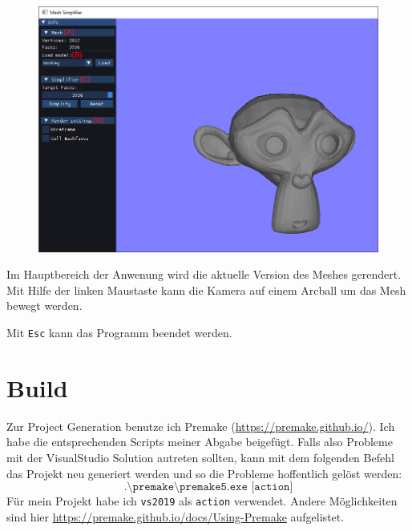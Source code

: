 \documentclass[a4paper,12pt]{book}
\begin{document}
\begin{figure}[h]
	\centering
	\includegraphics[width=\linewidth]{gui.png}
\end{figure}

Im Hauptbereich der Anwenung wird die aktuelle Version des Meshes gerendert. Mit Hilfe der linken Maustaste kann die Kamera auf einem Arcball um das Mesh bewegt werden.

Mit \texttt{Esc} kann das Programm beendet werden.

\section*{Build}

Zur Project Generation benutze ich Premake (\url{https://premake.github.io/}). Ich habe die entsprechenden Scripts meiner Abgabe beigefügt.
Falls also Probleme mit der VisualStudio Solution autreten sollten,
kann mit dem folgenden Befehl das Projekt neu generiert werden und so die Probleme hoffentlich gelöst werden:
\[\texttt{.\textbackslash premake\textbackslash premake5.exe [action]}\]
Für mein Projekt habe ich \texttt{vs2019} als \texttt{action} verwendet. Andere Möglichkeiten sind hier \url{https://premake.github.io/docs/Using-Premake} aufgelistet.
\end{document}
